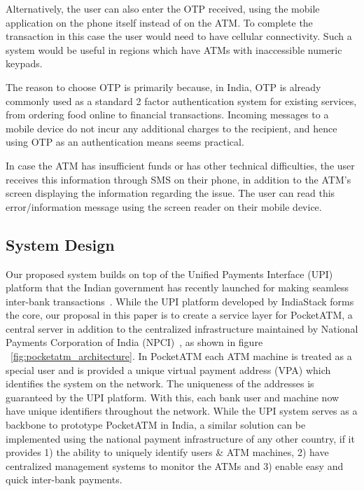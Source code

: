 Alternatively, the user can also enter the OTP received, using the mobile application on the phone itself instead of on the ATM. To complete the transaction in this case the user would need to have cellular connectivity. Such a system would be useful in regions which have ATMs with inaccessible numeric keypads. 

The reason to choose OTP is primarily because, in India, OTP is already commonly used as a standard 2 factor authentication system for existing services, from ordering food online to financial transactions. Incoming messages to a mobile device do not incur any additional charges to the recipient, and hence using OTP as an authentication means seems practical.

In case the ATM has insufficient funds or has other technical difficulties, the user receives this information through SMS on their phone, in addition to the ATM's screen displaying the information regarding the issue. The user can read this error/information message using the screen reader on their mobile device.

\subsection{System Design}
\label{ssec:systemdesign}

Our proposed system builds on top of the Unified Payments Interface (UPI) platform that the Indian government has recently launched for making seamless inter-bank transactions~\cite{UPI}. While the UPI platform developed by IndiaStack forms the core, our proposal in this paper is to create a service layer for PocketATM, a central server in addition to the centralized infrastructure maintained by National Payments Corporation of India (NPCI)~\cite{NPCINUUP}, as shown in figure ~\ref{fig:pocketatm_architecture}. In PocketATM each ATM machine is treated as a special user and is provided a unique virtual payment address (VPA) which identifies the system on the network. The uniqueness of the addresses is guaranteed by the UPI platform. With this, each bank user and machine now have unique identifiers throughout the network. While the UPI system serves as a backbone to prototype PocketATM in India, a similar solution can be implemented using the national payment infrastructure of any other country, if it provides 1) the ability to uniquely identify users \& ATM machines, 2) have centralized management systems to monitor the ATMs and 3) enable easy and quick inter-bank payments.

